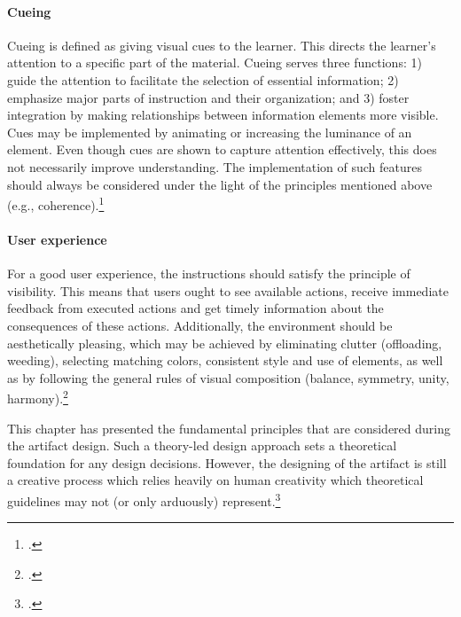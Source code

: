 \paragraph{Cueing} Cueing is defined as giving visual cues to the learner. This directs the learner's attention to a specific part of the material. Cueing serves three functions: 1) guide the attention to facilitate the selection of essential information; 2) emphasize major parts of instruction and their organization; and 3) foster integration by making relationships between information elements more visible. Cues may be implemented by animating or increasing the luminance of an element. Even though cues are shown to capture attention effectively, this does not necessarily improve understanding. The implementation of such features should always be considered under the light of the principles mentioned above (e.g., coherence).\footcites[Cf.][p.114 et seqq]{deKoningFrameworkAttentionCueing2009}[cf.][chapter 2, paragraph 14]{ClarkElearningscienceinstruction2016}

\paragraph{User experience} For a good user experience, the instructions should satisfy the principle of visibility. This means that users ought to see available actions, receive immediate feedback from executed actions and get timely information about the consequences of these actions. Additionally, the environment should be aesthetically pleasing, which may be achieved by eliminating clutter (offloading, weeding), selecting matching colors, consistent style and use of elements, as well as by following the general rules of visual composition (balance, symmetry, unity, harmony).\footcites[Cf.][p. 16 et seqq]{LeeScreenDesignGuidelines1999}[cf.][p. 16 et seqq]{Nadelhoffer10BestPractices}[cf.][p.20]{KirshInteractivitymultimediainterfaces1997}


This chapter has presented the fundamental principles that are considered during the artifact design. Such a theory-led design approach sets a theoretical foundation for any design decisions. However, the designing of the artifact is still a creative process which relies heavily on human creativity which theoretical guidelines may not (or only arduously) represent.\footcites[Cf.][p.7]{VaishnaviDesignScienceResearch}